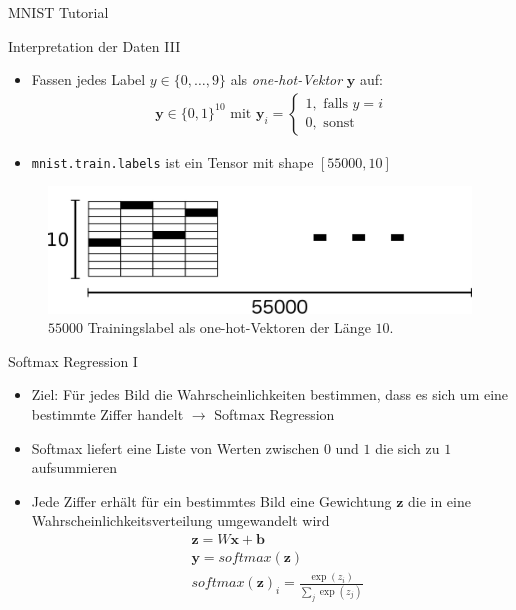 \documentclass[utf8, smaller, c]{beamer}
\renewcommand{\tt}[1]{{\texttt{#1}}}
\begin{document}
\begin{frame}{MNIST Tutorial}
	\framebreak
	
	\begin{block}{Interpretation der Daten III}
		\footnotesize
		\begin{itemize}
			\item Fassen jedes Label $y\in\{0,\dots,9\}$ als \textit{one-hot-Vektor} $\mathbf{y}$ auf:
			\begin{align*}
				\mathbf{y} \in \{0,1\}^{10} \text{ mit } \mathbf{y}_i = \begin{cases} 1, \text{ falls } y = i \\
				0, \text{ sonst} \end{cases}  
			\end{align*}
			\item \tt{mnist.train.labels} ist ein Tensor mit shape $[55000, 10]$
		\end{itemize}
		\begin{figure}[c]
			\includegraphics[scale=0.085]{pics/mnist_train_ys}
			\caption{$55000$ Trainingslabel als one-hot-Vektoren der Länge $10$.}
		\end{figure}					
	\end{block}
	
	\begin{block}{Softmax Regression I}
		\begin{itemize}
			\item Ziel: Für jedes Bild die Wahrscheinlichkeiten bestimmen, dass es sich um eine bestimmte Ziffer
			handelt $\rightarrow$ Softmax Regression
			\item Softmax liefert eine Liste von Werten zwischen $0$ und $1$ die sich zu $1$ aufsummieren
			\item Jede Ziffer erhält für ein bestimmtes Bild eine Gewichtung $\mathbf{z}$ die in eine
			Wahrscheinlichkeitsverteilung umgewandelt wird
			\begin{align*}
				&\mathbf{z} = W\mathbf{x} + \mathbf{b} \\
				&\mathbf{y} = softmax(\mathbf{z})\\
				&softmax(\mathbf{z})_i = \frac{\exp(z_i)}{\sum_j\exp(z_j)}
			\end{align*}
		\end{itemize}			
	\end{block}
	

\end{frame}
\end{document}
